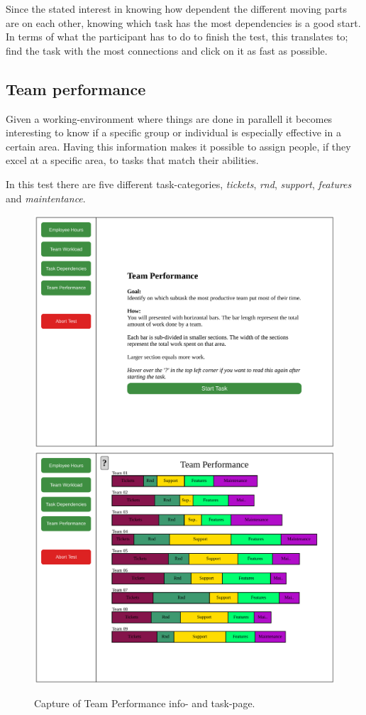 {    Since the stated interest in knowing how dependent the different
    moving parts are on each other, knowing which task has the most
    dependencies is a good start. In terms of what the participant has to
    do to finish the test, this translates to; find the task with the most
    connections and click on it as fast as possible.

    \subsection{Team performance}

    \textit{\ideaFour}

    Given a working-environment where things are done in parallell it
    becomes interesting to know if a specific group or individual is
    especially effective in a certain area. Having this information makes
    it possible to assign people, if they excel at a specific area, to
    tasks that match their abilities.

    In this test there are five different task-categories,
    \textit{tickets},
    \textit{rnd},
    \textit{support},
    \textit{features} and
    \textit{maintentance}.

    \begin{figure}[h!]
      \centering
      \includegraphics[width=.49\textwidth]{figures/captures/webapp_team_performance_info.pdf}
      \includegraphics[width=.49\textwidth]{figures/captures/webapp_team_performance_task.pdf}
      \caption{Capture of Team Performance info- and task-page.}
    \end{figure}

}
